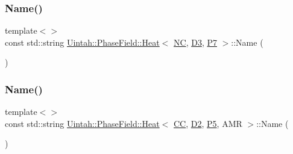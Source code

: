 \mbox{\label{classUintah_1_1PhaseField_1_1Heat_ae3f72af7abe8777489750b4cca9d0386}} 
\subsubsection{\texorpdfstring{Name()}{Name()}\hspace{0.1cm}{\footnotesize\ttfamily [4/8]}}
{\footnotesize\ttfamily template$<$$>$ \\
const std\+::string \hyperlink{classUintah_1_1PhaseField_1_1Heat}{Uintah\+::\+Phase\+Field\+::\+Heat}$<$ \hyperlink{namespaceUintah_1_1PhaseField_a33d355affda78a83f45755ba8388cedda77924170fe82bfd58b74ca3e44139718}{NC}, \hyperlink{namespaceUintah_1_1PhaseField_a12bfc68444894dffdf0cb8d9cf0cc76aa72fd61934c7ca788c49ad90629f76e78}{D3}, \hyperlink{namespaceUintah_1_1PhaseField_a24d833a720598df1020f5cc2e75f8702a099a5b9a00f5644bb917fdec6afd8768}{P7} $>$\+::Name (\begin{DoxyParamCaption}{ }\end{DoxyParamCaption})}

\mbox{\label{classUintah_1_1PhaseField_1_1Heat_aaadfc711b6e8dbf57965173385ff8de8}} 
\subsubsection{\texorpdfstring{Name()}{Name()}\hspace{0.1cm}{\footnotesize\ttfamily [5/8]}}
{\footnotesize\ttfamily template$<$$>$ \\
const std\+::string \hyperlink{classUintah_1_1PhaseField_1_1Heat}{Uintah\+::\+Phase\+Field\+::\+Heat}$<$ \hyperlink{namespaceUintah_1_1PhaseField_a33d355affda78a83f45755ba8388cedda22303704507d024d1d6508ed9859a85a}{CC}, \hyperlink{namespaceUintah_1_1PhaseField_a12bfc68444894dffdf0cb8d9cf0cc76aa1a451dae278b0103a94105c8776e9a67}{D2}, \hyperlink{namespaceUintah_1_1PhaseField_a24d833a720598df1020f5cc2e75f8702a218e7fca21085b602c79158a04bc83a0}{P5}, A\+MR $>$\+::Name (\begin{DoxyParamCaption}{ }\end{DoxyParamCaption})}

